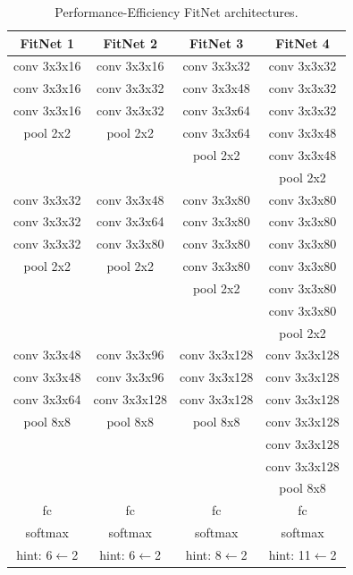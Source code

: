 \documentclass{article} %
\begin{document}
\begin{table}
\center
\begin{tabular}{|c|c|c|c|}
\hline
 FitNet 1 & FitNet 2 & FitNet 3 & FitNet 4\\
\hline
\hline
 conv 3x3x16 &  conv 3x3x16 & conv 3x3x32 & conv 3x3x32\\
 conv 3x3x16 &  conv 3x3x32 & conv 3x3x48 & conv 3x3x32\\
 conv 3x3x16 &  conv 3x3x32 & conv 3x3x64 & conv 3x3x32\\
 pool 2x2    &  pool 2x2    & conv 3x3x64 & conv 3x3x48\\
             &              & pool 2x2    & conv 3x3x48\\
             &              &             & pool 2x2\\
\hline
 conv 3x3x32 &  conv 3x3x48 & conv 3x3x80 & conv 3x3x80\\
 conv 3x3x32 &  conv 3x3x64 & conv 3x3x80 & conv 3x3x80\\
 conv 3x3x32 &  conv 3x3x80 & conv 3x3x80 & conv 3x3x80\\
 pool 2x2    &  pool 2x2    & conv 3x3x80 & conv 3x3x80\\
             &              & pool 2x2    & conv 3x3x80\\
             &              &             & conv 3x3x80\\
             &              &             & pool 2x2\\
\hline
 conv 3x3x48 & conv 3x3x96   & conv 3x3x128 & conv 3x3x128\\
 conv 3x3x48 & conv 3x3x96   & conv 3x3x128 & conv 3x3x128\\
 conv 3x3x64 & conv 3x3x128 & conv 3x3x128 & conv 3x3x128\\
 pool 8x8        & pool 8x8           & pool 8x8           & conv 3x3x128\\
                         &                            &                            & conv 3x3x128\\
                         &                            &                            & conv 3x3x128\\
                         &                            &                            & pool 8x8\\
\hline
 fc   & fc & fc & fc\\
 softmax  & softmax & softmax & softmax\\
\hline
hint: 6$\leftarrow$2 & hint: 6$\leftarrow$2 & hint: 8$\leftarrow$2 & hint: 11$\leftarrow$2\\
\hline
\end{tabular}

\caption{Performance-Efficiency FitNet architectures.}
\label{tab:cifar100_fitnet}
\end{table}
\end{document}
